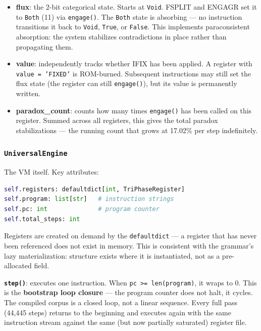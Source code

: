 \documentclass[12pt,a4paper]{article}
\begin{document}
\begin{itemize}
    \item \textbf{flux}: the 2-bit categorical state. Starts at \texttt{Void}. FSPLIT and ENGAGR set it to \texttt{Both} (11) via \texttt{engage()}. The \texttt{Both} state is absorbing --- no instruction transitions it back to \texttt{Void}, \texttt{True}, or \texttt{False}. This implements paraconsistent absorption: the system stabilizes contradictions in place rather than propagating them.
    \item \textbf{value}: independently tracks whether IFIX has been applied. A register with \texttt{value = 'FIXED'} is ROM-burned. Subsequent instructions may still set the flux state (the register can still \texttt{engage()}), but its value is permanently written.
    \item \textbf{paradox\_count}: counts how many times \texttt{engage()} has been called on this register. Summed across all registers, this gives the total paradox stabilizations --- the running count that grows at 17.02\% per step indefinitely.
\end{itemize}

\subsubsection{\texttt{UniversalEngine}}

The VM itself. Key attributes:

\begin{lstlisting}[language=Python]
self.registers: defaultdict[int, TriPhaseRegister]
self.program: list[str]   # instruction strings
self.pc: int              # program counter
self.total_steps: int
\end{lstlisting}

Registers are created on demand by the \texttt{defaultdict} --- a register that has never been referenced does not exist in memory. This is consistent with the grammar's lazy materialization: structure exists where it is instantiated, not as a pre-allocated field.

\textbf{\texttt{step()}}: executes one instruction. When \texttt{pc \textgreater{}= len(program)}, it wraps to 0. This is the \textbf{bootstrap loop closure} --- the program counter does not halt, it cycles. The compiled corpus is a closed loop, not a linear sequence. Every full pass (44,445 steps) returns to the beginning and executes again with the same instruction stream against the same (but now partially saturated) register file.
\end{document}
